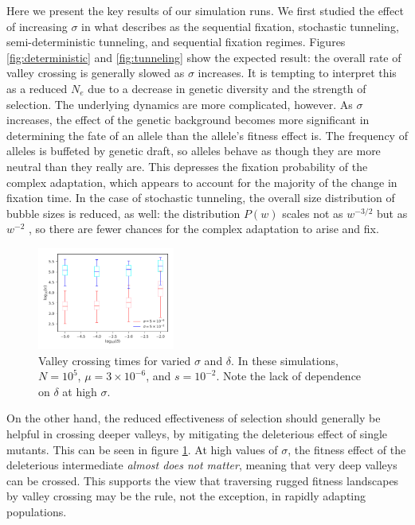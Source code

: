 \documentclass[rmp]{revtex4}
\begin{document}
Here we present the key results of our simulation runs.
We first studied the effect of increasing $\sigma$ in what \citet{weissman_2009} describes as the sequential fixation, stochastic tunneling, semi-deterministic tunneling, and sequential fixation regimes.
Figures \ref{fig:deterministic} and \ref{fig:tunneling} show the expected result: the overall rate of valley crossing is generally slowed as $\sigma$ increases.
It is tempting to interpret this as a reduced $N_e$ due to a decrease in genetic diversity and the strength of selection.
The underlying dynamics are more complicated, however.
As $\sigma$ increases, the effect of the genetic background becomes more significant in determining the fate of an allele than the allele's fitness effect is.
The frequency of alleles is buffeted by genetic draft, so alleles behave as though they are more neutral than they really are.
This depresses the fixation probability of the complex adaptation, which appears to account for the majority of the change in fixation time.
In the case of stochastic tunneling, the overall size distribution of bubble sizes is reduced, as well: the distribution $P(w)$ scales not as $w^{-3/2}$ but as $w^{-2}$ \citep{neher_shraiman_2011}, so there are fewer chances for the complex adaptation to arise and fix.

\begin{figure}
\includegraphics[width=0.4\textwidth]{Figures/var_sigma_delta.pdf}
\caption{Valley crossing times for varied $\sigma$ and $\delta$. In these simulations, $N = 10^5$, $\mu = 3 \times 10^{-6}$, and $s = 10^{-2}$. Note the lack of dependence on $\delta$ at high $\sigma$.}
\label{fig:sigma_delta}
\end{figure}

On the other hand, the reduced effectiveness of selection should generally be helpful in crossing deeper valleys, by mitigating the deleterious effect of single mutants.
This can be seen in figure \ref{fig:sigma_delta}.
At high values of $\sigma$, the fitness effect of the deleterious intermediate \emph{almost does not matter}, meaning that very deep valleys can be crossed.
This supports the view that traversing rugged fitness landscapes by valley crossing may be the rule, not the exception, in rapidly adapting populations.
\end{document}
